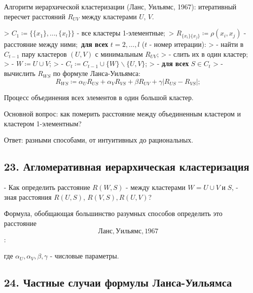 Алгоритм иерархической кластеризации (Ланс, Уильямс, 1967): итеративный
пересчет расстояний $R_{UV}$ между кластерами $U$, $V$.

> $C_1 \coloneqq {\lbrace {\lbrace x_1 \rbrace}, \ldots, {\lbrace x_l \rbrace} \rbrace}$ - все кластеры 1-элементные;\
> $R_{{\lbrace x_i \rbrace}{\lbrace x_j \rbrace}} \coloneqq \rho{(x_i, x_j)}$ - расстояние между ними;\
\textbf{для всех} $t = 2, \ldots, l$ ($t$ - номер итерации):
> - найти в $C_{t-1}$ пару кластеров ${(U, V)}$ с минимальным $R_{UV}$;
> - слить их в один кластер;
> - $W \coloneqq U \cup V$;
> - $C_t \coloneqq C_{t-1} \cup {\lbrace W \rbrace} \backslash {\lbrace U, V \rbrace}$;
> - \textbf{для всех} $S \in C_t$
>   - вычислить $R_{WS}$ по формуле Ланса-Уильямса:$$R_{WS} \coloneqq \alpha_{U} R_{US} + \alpha_{V} R_{VS} + \beta R_{UV} + \gamma{\vert R_{US} - R_{VS} \vert};$$

Процесс объединения всех элементов в один большой кластер.

Основной вопрос: как померить расстояние между объединенным кластером и
кластером 1-элементным?

Ответ: разными способами, от интуитивных до рациональных.

\subsection{23. Агломеративная иерархическая кластеризация}

- Как определить расстояние $R{(W, S)}$
- между кластерами $W = U \cup V \; \text{и} \; S$,
- зная расстояния $R{(U, S)}$, $R{(V, S)}, R{(U, V)}$?

Формула, обобщающая большинство разумных способов определить это расстояние
\[Ланс, Уильямс, 1967\]:

где $\alpha_{U}, \alpha_{V}, \beta, \gamma$ - числовые параметры.

\subsection{24. Частные случаи формулы Ланса-Уильямса}

